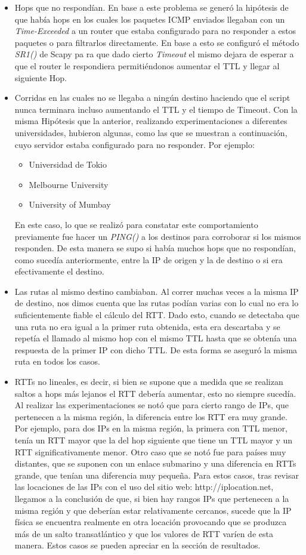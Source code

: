 \begin{itemize}
    \item Hops que no respondían. En base a este problema se generó la hipótesis de que había hops en los cuales los paquetes ICMP enviados llegaban con un \textit{Time-Exceeded} a un router que estaba configurado para no responder a estos paquetes o para filtrarlos directamente. En base a esto se configuró el método \textit{SR1()} de Scapy pa ra que dado cierto \textit{Timeout} el mismo dejara de esperar a que el router le respondiera permitiéndonos aumentar el TTL y llegar al siguiente Hop.
    \item Corridas en las cuales no se llegaba a ningún destino haciendo que el script nunca terminara incluso aumentando el TTL y el tiempo de Timeout. Con la misma Hipótesis que la anterior, realizando experimentaciones a diferentes universidades, hubieron algunas, como las que se muestran a continuación, cuyo servidor estaba configurado para no responder. Por ejemplo:
    \begin{itemize}
        \item Universidad de Tokio
        \item Melbourne University
        \item University of Mumbay
    \end{itemize}
    En este caso, lo que se realizó para constatar este comportamiento previamente fue hacer un \textit{PING()} a los destinos para corroborar si los mismos responden. De esta manera se supo si había muchos hops que no respondían, como sucedía anteriormente, entre la IP de origen y la de destino o si era efectivamente el destino.
    \item Las rutas al mismo destino cambiaban. Al correr muchas veces a la misma IP de destino, nos dimos cuenta que las rutas podían varias con lo cual no era lo suficientemente fiable el cálculo del RTT. Dado esto, cuando se detectaba que una ruta no era igual a la primer ruta obtenida, esta era descartaba y se repetía el llamado al mismo hop con el mismo TTL hasta que se obtenía una respuesta de la primer IP con dicho TTL. De esta forma se aseguró la misma ruta en todos los casos.
    \item RTTs no lineales, es decir, si bien se supone que a medida que se realizan saltos a hops más lejanos el RTT debería aumentar, esto no siempre sucedía. Al realizar las experimentaciones se notó que para cierto rango de IPs, que pertenecen a la misma región, la diferencia entre los RTT era muy grande. Por ejemplo, para dos IPs en la misma región, la primera con TTL menor, tenía un RTT mayor que la del hop siguiente que tiene un TTL mayor y un RTT significativamente menor. Otro caso que se notó fue para países muy distantes, que se suponen con un enlace submarino y una diferencia en RTTs grande, que tenían una diferencia muy pequeña. Para estos casos, tras revisar las locaciones de las IPs con el uso del sitio web: http://iplocation.net, llegamos a la conclusión de que, si bien hay rangos IPs que pertenecen a la misma región y que deberían estar relativamente cercanos, sucede que la IP física se encuentra realmente en otra locación provocando que se produzca más de un salto transatlántico y que los valores de RTT varíen de esta manera. Estos casos se pueden apreciar en la sección de resultados.

\end{itemize}
